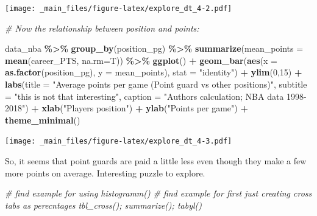 \documentclass[
]{book}
\newenvironment{Shaded}{\begin{snugshade}}{\end{snugshade}}
\newcommand{\AttributeTok}[1]{\textcolor[rgb]{0.13,0.29,0.53}{#1}}
\newcommand{\CommentTok}[1]{\textcolor[rgb]{0.56,0.35,0.01}{\textit{#1}}}
\newcommand{\DecValTok}[1]{\textcolor[rgb]{0.00,0.00,0.81}{#1}}
\newcommand{\FunctionTok}[1]{\textcolor[rgb]{0.13,0.29,0.53}{\textbf{#1}}}
\newcommand{\NormalTok}[1]{#1}
\newcommand{\SpecialCharTok}[1]{\textcolor[rgb]{0.81,0.36,0.00}{\textbf{#1}}}
\newcommand{\StringTok}[1]{\textcolor[rgb]{0.31,0.60,0.02}{#1}}
\begin{document}
\texttt{[image: \_main\_files/figure-latex/explore\_dt\_4-2.pdf]}

\begin{Shaded}
\begin{Highlighting}[]
\CommentTok{\# Now the relationship between position and points:}

\NormalTok{data\_nba }\SpecialCharTok{\%\textgreater{}\%} 
  \FunctionTok{group\_by}\NormalTok{(position\_pg) }\SpecialCharTok{\%\textgreater{}\%}
  \FunctionTok{summarize}\NormalTok{(}\AttributeTok{mean\_points =} \FunctionTok{mean}\NormalTok{(career\_PTS, }\AttributeTok{na.rm=}\NormalTok{T)) }\SpecialCharTok{\%\textgreater{}\%}
  \FunctionTok{ggplot}\NormalTok{() }\SpecialCharTok{+}
  \FunctionTok{geom\_bar}\NormalTok{(}\FunctionTok{aes}\NormalTok{(}\AttributeTok{x =} \FunctionTok{as.factor}\NormalTok{(position\_pg), }
               \AttributeTok{y =}\NormalTok{ mean\_points),}
           \AttributeTok{stat =} \StringTok{"identity"}\NormalTok{) }\SpecialCharTok{+} 
  \FunctionTok{ylim}\NormalTok{(}\DecValTok{0}\NormalTok{,}\DecValTok{15}\NormalTok{) }\SpecialCharTok{+}
  \FunctionTok{labs}\NormalTok{(}\AttributeTok{title =} \StringTok{"Average points per game (Point guard vs other positions)"}\NormalTok{,}
       \AttributeTok{subtitle =} \StringTok{"this is not that interesting"}\NormalTok{,}
       \AttributeTok{caption =} \StringTok{"Authors\textquotesingle{} calculation; NBA data 1998{-}2018"}\NormalTok{) }\SpecialCharTok{+}
  \FunctionTok{xlab}\NormalTok{(}\StringTok{"Player\textquotesingle{}s position"}\NormalTok{) }\SpecialCharTok{+}
  \FunctionTok{ylab}\NormalTok{(}\StringTok{"Points per game"}\NormalTok{) }\SpecialCharTok{+}
  \FunctionTok{theme\_minimal}\NormalTok{()}
\end{Highlighting}
\end{Shaded}

\texttt{[image: \_main\_files/figure-latex/explore\_dt\_4-3.pdf]}

So, it seems that point guards are paid a little less even though they make a few more points on average. Interesting puzzle to explore.

\begin{Shaded}
\begin{Highlighting}[]
\CommentTok{\# find example for using histogramm()}
\CommentTok{\# find example for first just creating cross tabs as perecntages tbl\_cross(); summarize(); tabyl()}
\end{Highlighting}
\end{Shaded}
\end{document}
